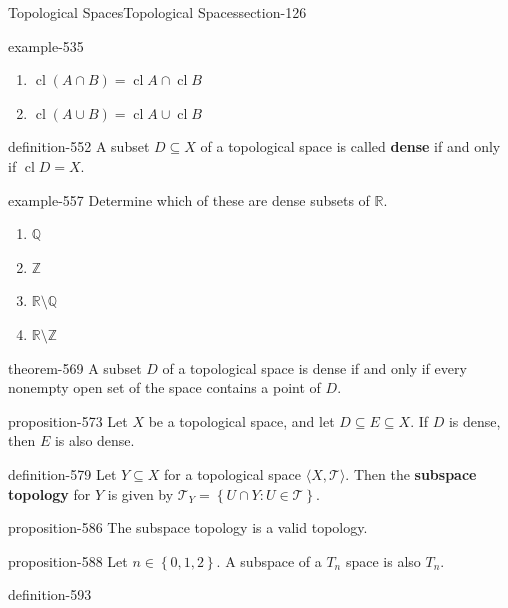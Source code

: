 \documentclass[oneside,10pt,]{article}
\newcommand{\terminology}[1]{\textbf{#1}}
\newcommand{\tuple}[1]{\langle #1 \rangle}
\newcommand{\mb}{\mathbb}
\newcommand{\mc}{\mathcal}
\newcommand{\cl}{\operatorname{cl}}
\newcommand{\setBuilder}[2]{\left\{#1:#2\right\}}
\newcommand{\setList}[1]{\left\{#1\right\}}
\begin{document}
\begin{sectionptx}{Topological Spaces}{}{Topological Spaces}{}{}{section-126}
\begin{example}{}{example-535}
\begin{enumerate}
\item\hypertarget{li-548}{}\(\cl(A\cap B)=\cl A\cap\cl B\)%
\item\hypertarget{li-550}{}\(\cl(A\cup B)=\cl A\cup\cl B\)%
\end{enumerate}
\end{example}
\begin{definition}{}{definition-552}%
\hypertarget{p-553}{}%
A subset \(D\subseteq X\) of a topological space is called \terminology{dense} if and only if \(\cl D=X\).%
\end{definition}
\begin{example}{}{example-557}%
\hypertarget{p-558}{}%
Determine which of these are dense subsets of \(\mb R\).%
\leavevmode%
\begin{enumerate}
\item\hypertarget{li-561}{}\(\mb Q\)%
\item\hypertarget{li-563}{}\(\mb Z\)%
\item\hypertarget{li-565}{}\(\mb R\setminus\mb Q\)%
\item\hypertarget{li-567}{}\(\mb R\setminus\mb Z\)%
\end{enumerate}
\end{example}
\begin{theorem}{}{}{theorem-569}%
\hypertarget{p-570}{}%
A subset \(D\) of a topological space is dense if and only if every nonempty open set of the space contains a point of \(D\).%
\end{theorem}
\begin{proposition}{}{}{proposition-573}%
\hypertarget{p-574}{}%
Let \(X\) be a topological space, and let \(D\subseteq E\subseteq X\). If \(D\) is dense, then \(E\) is also dense.%
\end{proposition}
\begin{definition}{}{definition-579}%
\hypertarget{p-580}{}%
Let \(Y\subseteq X\) for a topological space \(\tuple{X,\mc T}\). Then the \terminology{subspace topology} for \(Y\) is given by \(\mc T_Y=\setBuilder{U\cap Y}{U\in\mc T}\).%
\end{definition}
\begin{proposition}{}{}{proposition-586}%
\hypertarget{p-587}{}%
The subspace topology is a valid topology.%
\end{proposition}
\begin{proposition}{}{}{proposition-588}%
\hypertarget{p-589}{}%
Let \(n\in\setList{0,1,2}\). A subspace of a \(T_n\) space is also \(T_n\).%
\end{proposition}
\begin{definition}{}{definition-593}%

\end{definition}
\end{sectionptx}
\end{document}
